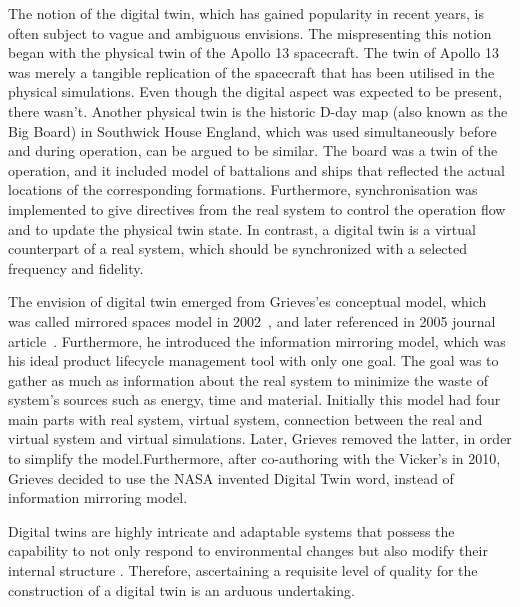 \documentclass{llncs}
\begin{document}
    The notion of the digital twin, which has gained popularity in 
    recent years, is often subject to vague and ambiguous envisions\cite{Review1}.
    The mispresenting this notion began with the physical twin of the Apollo 13 spacecraft. 
    The twin of Apollo 13 was merely a tangible replication of the spacecraft that has been utilised in the physical simulations. 
    Even though the digital aspect was expected to be present, there wasn't\cite{GrievesApollo13}.
    Another physical twin is the historic D-day map (also known as the Big Board) in Southwick House England, 
    which was used simultaneously before and during operation, can be argued to be similar. 
    The board was a twin of the operation, and it included model of battalions and ships that reflected the actual 
    locations of the corresponding formations. Furthermore, synchronisation was 
    implemented to give directives from the real system to control the operation 
    flow and to update the physical twin state\cite{AMRC}.
    In contrast, a digital twin is a virtual counterpart of a real system, which should 
    be synchronized with a selected frequency and fidelity\cite{Review1,Review2,digitaltwinconsortium2022}.
    
    The envision of digital twin emerged from Grieves'es conceptual model, which was called mirrored spaces model in 2002~\cite{Originsofdigitaltwinconcept},
    and later referenced in 2005 journal article~\cite{2005JournayArticle}. 
    Furthermore, he introduced the information mirroring model, which was his ideal product lifecycle management tool with only one goal. 
    The goal was to gather as much as  information about the real system to minimize the waste of system's sources such as energy, 
    time and material. Initially this model had four main parts with real system, 
    virtual system, connection between the real and virtual system and virtual simulations\cite{GrievesPLMBook}. 
    Later, Grieves removed the latter, in order to simplify the model\cite{Originsofdigitaltwinconcept}.Furthermore, after co-authoring with the Vicker's in 2010, 
    Grieves decided to use the NASA invented Digital Twin word, instead of information mirroring model\cite{Originsofdigitaltwinconcept}.
        
    Digital twins are highly intricate and adaptable systems that possess the capability to not only respond to environmental 
    changes but also modify their internal structure \cite{ZHANGUPDATEMETHOD,MobusSystemTheory}. Therefore, ascertaining a 
    requisite level of quality for the construction of a digital twin is an arduous undertaking.
\end{document}
